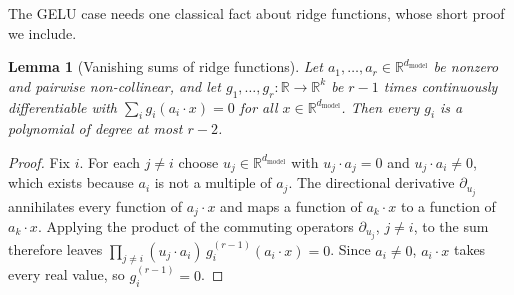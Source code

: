 \documentclass[10pt]{article}
\newtheorem{lemma}[theorem]{Lemma}
\theoremstyle{definition}
\theoremstyle{remark}
\newcommand{\R}{\mathbb{R}}
\newcommand{\dm}{d_{\mathrm{model}}}
\begin{document}
The GELU case needs one classical fact about ridge functions, whose short proof we include.

\begin{lemma}[Vanishing sums of ridge functions]\label{lem:ridge}
Let $a_1, \dots, a_r \in \R^{\dm}$ be nonzero and pairwise non-collinear, and let $g_1, \dots, g_r : \R \to \R^k$ be $r-1$ times continuously differentiable with $\sum_{i} g_i(a_i\cdot x) = 0$ for all $x \in \R^{\dm}$. Then every $g_i$ is a polynomial of degree at most $r-2$.
\end{lemma}
\begin{proof}
Fix $i$. For each $j \neq i$ choose $u_j \in \R^{\dm}$ with $u_j\cdot a_j = 0$ and $u_j\cdot a_i \neq 0$, which exists because $a_i$ is not a multiple of $a_j$. The directional derivative $\partial_{u_j}$ annihilates every function of $a_j\cdot x$ and maps a function of $a_k\cdot x$ to a function of $a_k\cdot x$. Applying the product of the commuting operators $\partial_{u_j}$, $j \neq i$, to the sum therefore leaves $\prod_{j \neq i}(u_j\cdot a_i)\, g_i^{(r-1)}(a_i\cdot x) = 0$. Since $a_i \neq 0$, $a_i\cdot x$ takes every real value, so $g_i^{(r-1)} = 0$.
\end{proof}
\end{document}
